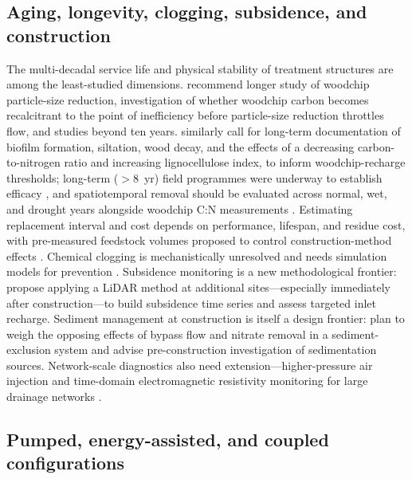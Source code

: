 \subsection{Aging, longevity, clogging, subsidence, and construction}

The multi-decadal service life and physical stability of treatment structures are
among the least-studied dimensions. \textcite{Ghane2018} recommend longer study
of woodchip particle-size reduction, investigation of whether woodchip carbon
becomes recalcitrant to the point of inefficiency before particle-size reduction
throttles flow, and studies beyond ten years. \textcite{Christianson2020}
similarly call for long-term documentation of biofilm formation, siltation, wood
decay, and the effects of a decreasing carbon-to-nitrogen ratio and increasing
lignocellulose index, to inform woodchip-recharge thresholds; long-term
($>$8~yr) field programmes were underway to establish efficacy
\parencite{Greenan2009}, and spatiotemporal removal should be evaluated across
normal, wet, and drought years alongside woodchip C:N measurements
\parencite{Hartfiel2023b}. Estimating replacement interval and cost depends on
performance, lifespan, and residue cost, with pre-measured feedstock volumes
proposed to control construction-method effects \parencite{Kohn2023}. Chemical
clogging is mechanistically unresolved and needs simulation models for prevention
\parencite{Guo2020,Guo2021}. Subsidence monitoring is a new methodological
frontier: \textcite{Christianson2025b} propose applying a LiDAR method at
additional sites---especially immediately after construction---to build
subsidence time series and assess targeted inlet recharge. Sediment management at
construction is itself a design frontier: \textcite{Feyereisen2023} plan to weigh
the opposing effects of bypass flow and nitrate removal in a sediment-exclusion
system and advise pre-construction investigation of sedimentation sources.
Network-scale diagnostics also need extension---higher-pressure air injection and
time-domain electromagnetic resistivity monitoring for large drainage networks
\parencite{Henine2021}.

\subsection{Pumped, energy-assisted, and coupled configurations}

